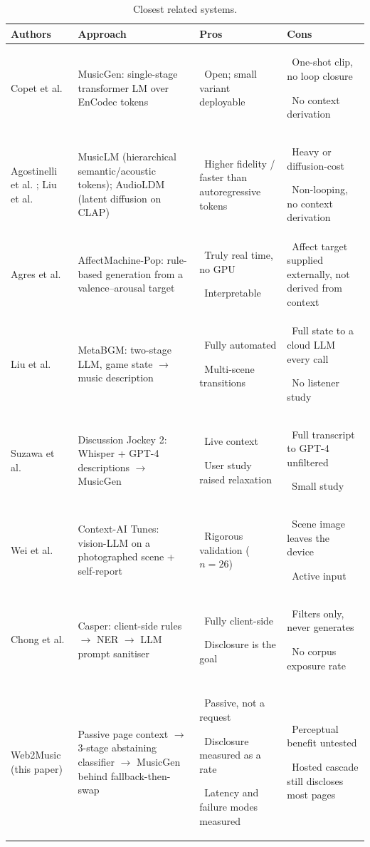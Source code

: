 \documentclass[conference]{IEEEtran}
\newcommand{\bl}[1]{\par{\hangindent=6pt\hangafter=1\noindent\textbullet\ #1}}
\let\IEEEoriginalcaption\caption
\renewcommand{\caption}[1]{\IEEEoriginalcaption{\footnotesize #1}}
\begin{document}
\begin{table}[!t]
\caption{Closest related systems.}
\label{tab:litreview}
\begin{center}
\scriptsize
\setlength{\tabcolsep}{4pt}
\begin{tabular}{p{0.95in}p{1.95in}p{1.6in}p{1.7in}}
\toprule
\textbf{Authors} & \textbf{Approach} & \textbf{Pros} & \textbf{Cons} \\
\midrule
Copet et al. \cite{musicgen} & MusicGen: single-stage transformer LM over EnCodec tokens &
\bl{Open; small variant deployable} &
\bl{One-shot clip, no loop closure}\bl{No context derivation} \\[1.5pt]
Agostinelli et al. \cite{musiclm}; Liu et al. \cite{audioldm} & MusicLM (hierarchical semantic/acoustic tokens); AudioLDM (latent diffusion on CLAP) &
\bl{Higher fidelity / faster than autoregressive tokens} &
\bl{Heavy or diffusion-cost}\bl{Non-looping, no context derivation} \\[1.5pt]
Agres et al. \cite{affectmachine} & AffectMachine-Pop: rule-based generation from a valence--arousal target &
\bl{Truly real time, no GPU}\bl{Interpretable} &
\bl{Affect target supplied externally, not derived from context} \\[1.5pt]
Liu et al. \cite{metabgm} & MetaBGM: two-stage LLM, game state $\to$ music description &
\bl{Fully automated}\bl{Multi-scene transitions} &
\bl{Full state to a cloud LLM every call}\bl{No listener study} \\[1.5pt]
Suzawa et al. \cite{discussionjockey} & Discussion Jockey 2: Whisper + GPT-4 descriptions $\to$ MusicGen &
\bl{Live context}\bl{User study raised relaxation} &
\bl{Full transcript to GPT-4 unfiltered}\bl{Small study} \\[1.5pt]
Wei et al. \cite{contextaitunes} & Context-AI Tunes: vision-LLM on a photographed scene + self-report &
\bl{Rigorous validation ($n=26$)} &
\bl{Scene image leaves the device}\bl{Active input} \\[1.5pt]
Chong et al. \cite{casper} & Casper: client-side rules $\to$ NER $\to$ LLM prompt sanitiser &
\bl{Fully client-side}\bl{Disclosure is the goal} &
\bl{Filters only, never generates}\bl{No corpus exposure rate} \\[1.5pt]
\midrule
Web2Music (this paper) & Passive page context $\to$ 3-stage abstaining classifier $\to$ MusicGen behind fallback-then-swap &
\bl{Passive, not a request}\bl{Disclosure measured as a rate}\bl{Latency and failure modes measured} &
\bl{Perceptual benefit untested}\bl{Hosted cascade still discloses most pages} \\
\bottomrule
\end{tabular}
\end{center}
\end{table}
\end{document}
